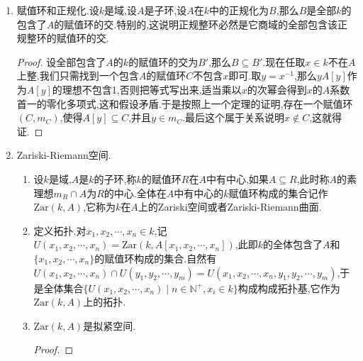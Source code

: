 \begin{enumerate}
\begin{enumerate}[(1)]
\begin{proof}
    		不妨$n\ge m$,否则以$x^{-1}$代替$x$.在等式$1=c_1x^{-1}+c_2x^{-2}+\cdots+c_mx^{-m}$两侧乘以$b_nx^n$得到$b_nx^n=b_nc_1x^{n-1}+b_nc_2x^{n-2}+\cdots+b_nc_mx^{n-m}$.倘若$n>m$,那么利用这个等式带入$1=b_1x+b_2x^2+\cdots+b_nx^n$消去最高次项,它的常数项仍然在左侧,于是这和$n$的最小性相矛盾;如果$n=m$,带入后得到一个次数为$n-1$的多项式,按照$1-b_nc_m$是单位,仍然可以把它改进为满足相同条件的次数为$n-1$的多项式,这又和$n$的定义相矛盾.于是说明$x$和$x^{-1}$中至少存在一个落在$B$中,于是$B$是赋值环.
    	\end{proof}
    	\item 稍加改进我们可以证明,给定域$k$的局部子环$(A,m)$,那么存在$k$的赋值环$(B,n)$控制了$A$,并且可要求它们的剩余类域扩张$A/m\subseteq B/n$是代数扩张.这个证明只要把上面证明中的$S$改为全部这样的$k$的局部子环,它控制了$A$,并且剩余类域扩张是代数扩张.
    	\item 反过来,我们断言如果存在$k$的局部子环$(B,n)$控制了$k$的赋值环$(A,m)$,那么$A=B$.这就说明了赋值环恰好是控制偏序下的极大元.事实上任取$b\in B$,假设$b\not\in A$,那么$b^{-1}\in A$,于是$b^{-1}$只能是$A$的非单位元,于是$b^{-1}\in m\subseteq n$,这导致$b\not\in B$矛盾.
    \end{enumerate}
    \item 赋值环和正规化.设$k$是域,设$A$是子环,设$A$在$k$中的正规化为$B$,那么$B$是全部$k$的包含了$A$的赋值环的交.特别的,这说明正规整环必然是它商域的全部包含该正规整环的赋值环的交.
    \begin{proof}
    	
    	设全部包含了$A$的$k$的赋值环的交为$B'$,那么$B\subseteq B'$.现在任取$x\in k$不在$A$上整,我们只需找到一个包含$A$的赋值环$C$不包含$x$即可.取$y=x^{-1}$,那么$yA[y]$作为$A[y]$的理想不包含1,否则把等式写出来,适当乘以$x$的次幂会得到$x$的$A$系数首一的零化多项式,这和假设矛盾.于是按照上一个定理的证明,存在一个赋值环$(C,m_C)$,使得$A[y]\subseteq C$,并且$y\in m_C$.最后这个属于关系说明$x\not\in C$,这就得证.
    \end{proof}
    \item Zariski-Riemann空间.
    \begin{enumerate}[(1)]
    	\item 设$k$是域,$A$是$k$的子环,称$k$的赋值环$R$在$A$中有中心,如果$A\subseteq R$,此时称$A$的素理想$m_R\cap A$为$R$的中心.全体在$A$中有中心的$k$赋值环构成的集合记作$\mathrm{Zar}(k,A)$,它称为$k$在$A$上的Zariski空间或者Zariski-Riemann曲面.
    	\item 定义拓扑.对$x_1,x_2,\cdots,x_n\in k$,记$U(x_1,x_2,\cdots,x_n)=\mathrm{Zar}(k,A[x_1,x_2,\cdots,x_n])$,此即$k$的全体包含了$A$和$\{x_1,x_2,\cdots,x_n\}$的赋值环构成的集合.自然有$U(x_1,x_2,\cdots,x_n)\cap U(y_1,y_2,\cdots,y_m)=U(x_1,x_2,\cdots,x_n,y_1,y_2,\cdots,y_m)$,于是全体集合$\{U(x_1,x_2,\cdots,x_n)\mid n\in\mathbb{N}^+,x_i\in k\}$构成构成拓扑基,它作为$\mathrm{Zar}(k,A)$上的拓扑.
    	\item $\mathrm{Zar}(k,A)$是拟紧空间.
    	\begin{proof}
    		

\end{proof}
\end{enumerate}
\end{enumerate}
